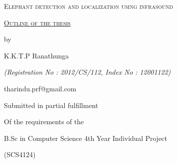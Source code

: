 \documentclass[11pt]{article}
\numberwithin{figure}{section}
\numberwithin{table}{section}
\renewcommand{\baselinestretch}{1.5}
\begin{document}
 


\begin{titlepage}
	
	\centering
	\renewcommand{\baselinestretch}{1.7}\normalsize
	
	{\fontsize{1cm}{1.2em}\selectfont \scshape Elephant detection and localization using infrasound}
	
	\vspace*{2\baselineskip}	
		

	\underline{\fontsize{0.8cm}{1.2em}\selectfont \scshape Outline of the thesis}
	\renewcommand{\baselinestretch}{1.25}\normalsize
	
	\vspace*{2\baselineskip}
	
	{by}
	
	\vspace*{0.3\baselineskip}
	{\Large K.K.T.P Ranathunga}
	\vspace*{0.3\baselineskip}
	
	{\itshape (Registration No : 2012/CS/112, Index No : 12001122)}
	
	{\normalsize tharindu.prf@gmail.com}
	
	\vspace*{2\baselineskip}
	
	\normalsize  {{Submitted in partial fulfillment}
		
		{Of the requirements of the}
		
		{B.Sc in Computer Science 4th Year Individual Project}
		
		{(SCS4124)}}
	
	\vspace*{2\baselineskip}
	

\end{titlepage}
\end{document}
